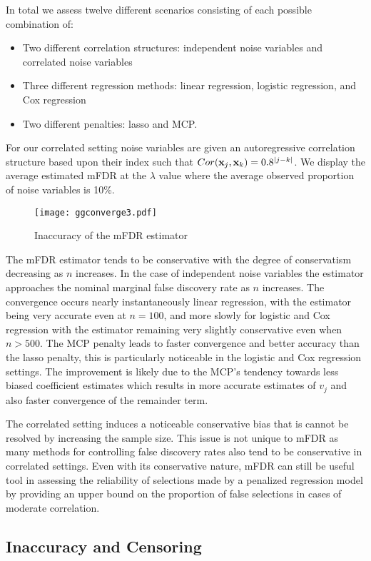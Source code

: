In total we assess twelve different scenarios consisting of each possible combination of:
\begin{itemize}
\item Two different correlation structures: independent noise variables and correlated noise variables
\item Three different regression methods: linear regression, logistic regression, and Cox regression
\item Two different penalties: lasso and MCP. 
\end{itemize}
For our correlated setting noise variables are given an autoregressive correlation structure based upon their index such that $Cor(\mathbf{x}_j,\mathbf{x}_k) = 0.8^{|j - k|}$. We display the average estimated mFDR at the $\lambda$ value where the average observed proportion of noise variables is 10\%.

\begin{figure} [!htb]
 \centering
  \texttt{[image: ggconverge3.pdf]}
  \caption{Inaccuracy of the mFDR estimator}
\end{figure}

The mFDR estimator tends to be conservative with the degree of conservatism decreasing as $n$ increases. In the case of independent noise variables the estimator approaches the nominal marginal false discovery rate as $n$ increases. The convergence occurs nearly instantaneously linear regression, with the estimator being very accurate even at $n=100$, and more slowly for logistic and Cox regression with the estimator remaining very slightly conservative even when $n > 500$. The MCP penalty leads to faster convergence and better accuracy than the lasso penalty, this is particularly noticeable in the logistic and Cox regression settings. The improvement is likely due to the MCP's tendency towards less biased coefficient estimates which results in more accurate estimates of $v_j$ and also faster convergence of the remainder term.

The correlated setting induces a noticeable conservative bias that is cannot be resolved by increasing the sample size. This issue is not unique to mFDR as many methods for controlling false discovery rates also tend to be conservative in correlated settings. Even with its conservative nature, mFDR can still be useful tool in assessing the reliability of selections made by a penalized regression model by providing an upper bound on the proportion of false selections in cases of moderate correlation.

\subsection{Inaccuracy and Censoring}

